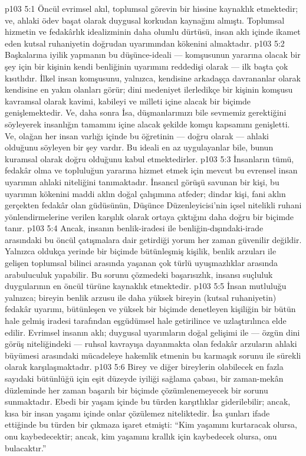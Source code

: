 \vs p103 5:1 Öncül evrimsel akıl, toplumsal görevin bir hissine kaynaklık etmektedir; ve, ahlaki ödev başat olarak duygusal korkudan kaynağını almıştı. Toplumsal hizmetin ve fedakârlık idealizminin daha olumlu dürtüsü, insan aklı içinde ikamet eden kutsal ruhaniyetin doğrudan uyarımından kökenini almaktadır.
\vs p103 5:2 Başkalarına iyilik yapmanın bu düşünce\hyp{}ideali --- komşusunun yararına olacak bir şey için bir kişinin kendi benliğinin uyarımını reddedişi olarak --- ilk başta çok kısıtlıdır. İlkel insan komşusunu, yalnızca, kendisine arkadaşça davrananlar olarak kendisine en yakın olanları görür; dini medeniyet ilerledikçe bir kişinin komşusu kavramsal olarak kavimi, kabileyi ve milleti içine alacak bir biçimde genişlemektedir. Ve, daha sonra İsa, düşmanlarımızı bile sevmemiz gerektiğini söyleyerek insanlığın tamamını içine alacak şekilde komşu kapsamını genişletti. Ve, olağan her insan varlığı içinde bu öğretinin --- doğru olarak --- ahlaki olduğunu söyleyen bir şey vardır. Bu ideali en az uygulayanlar bile, bunun kuramsal olarak doğru olduğunu kabul etmektedirler.
\vs p103 5:3 İnsanların tümü, fedakâr olma ve topluluğun yararına hizmet etmek için mevcut bu evrensel insan uyarımın ahlaki niteliğini tanımaktadır. İnsancıl görüşü savunan bir kişi, bu uyarımın kökenini maddi aklın doğal çalışımına atfeder; dindar kişi, fani aklın gerçekten fedakâr olan güdüsünün, Düşünce Düzenleyicisi’nin içsel nitelikli ruhani yönlendirmelerine verilen karşılık olarak ortaya çıktığını daha doğru bir biçimde tanır.
\vs p103 5:4 Ancak, insanın benlik\hyp{}iradesi ile benliğin\hyp{}dışındaki\hyp{}irade arasındaki bu öncül çatışmalara dair getirdiği yorum her zaman güvenilir değildir. Yalnızca oldukça yerinde bir biçimde bütünleşmiş kişilik, benlik arzuları ile gelişen toplumsal bilinci arasında yaşanan çok türlü uyuşmazlıklar arasında arabuluculuk yapabilir. Bu sorunu çözmedeki başarısızlık, insansı suçluluk duygularının en öncül türüne kaynaklık etmektedir.
\vs p103 5:5 İnsan mutluluğu yalnızca; bireyin benlik arzusu ile daha yüksek bireyin (kutsal ruhaniyetin) fedakâr uyarımı, bütünleşen ve yüksek bir biçimde denetleyen kişiliğin bir bütün hale gelmiş iradesi tarafından eşgüdümsel hale getirilince ve uzlaştırılınca elde edilir. Evrimsel insanın aklı; duygusal uyarımların doğal gelişimi ile --- özgün dini görüş niteliğindeki --- ruhsal kavrayışa dayanmakta olan fedakâr arzuların ahlaki büyümesi arasındaki mücadeleye hakemlik etmenin bu karmaşık sorunu ile sürekli olarak karşılaşmaktadır.
\vs p103 5:6 Birey ve diğer bireylerin olabilecek en fazla sayıdaki bütünlüğü için eşit düzeyde iyiliği sağlama çabası, bir zaman\hyp{}mekân düzleminde her zaman başarılı bir biçimde çözümlenemeyecek bir sorunu sunmaktadır. Ebedi bir yaşam içinde bu türden karşıtlıklar giderilebilir; ancak, kısa bir insan yaşamı içinde onlar çözülemez niteliktedir. İsa şunları ifade ettiğinde bu türden bir çıkmaza işaret etmişti: “Kim yaşamını kurtaracak olursa, onu kaybedecektir; ancak, kim yaşamını krallık için kaybedecek olursa, onu bulacaktır.”
